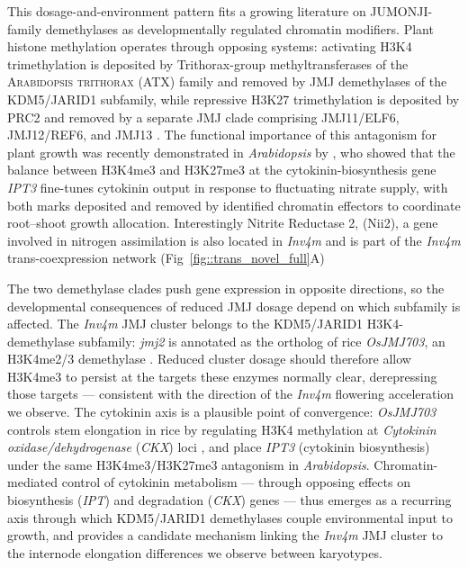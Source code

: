 \documentclass[9pt,twocolumn,twoside]{rilabRxiv}
\newcommand{\invfour}{\textit{Inv4m}\xspace}
\begin{document}
This dosage-and-environment pattern fits a growing literature on JUMONJI-family demethylases as developmentally regulated chromatin modifiers. 
Plant histone methylation operates through opposing systems: activating H3K4 trimethylation is deposited by Trithorax-group methyltransferases of the \textsc{Arabidopsis trithorax} (ATX) family \citep{Alvarez-Venegas2003-sy} and removed by JMJ demethylases of the KDM5/JARID1 subfamily, while repressive H3K27 trimethylation is deposited by PRC2 and removed by a separate JMJ clade comprising JMJ11/ELF6, JMJ12/REF6, and JMJ13 \citep{Lu2011-ie, Gan2015-xi}. 
The functional importance of this antagonism for plant growth was recently demonstrated in \textit{Arabidopsis} by \citet{bellegarde2025}, who showed that the balance between H3K4me3 and H3K27me3 at the cytokinin-biosynthesis gene \textit{IPT3} fine-tunes cytokinin output in response to fluctuating nitrate supply, with both marks deposited and removed by identified chromatin effectors to coordinate root--shoot growth allocation.
Interestingly Nitrite Reductase 2, (Nii2), a gene involved in nitrogen assimilation is also located in \invfour and is part of the \invfour trans-coexpression network (Fig~\ref{fig::trans_novel_full}A)

The two demethylase clades push gene expression in opposite directions, so the developmental consequences of reduced JMJ dosage depend on which subfamily is affected.
The \invfour JMJ cluster belongs to the KDM5/JARID1 H3K4-demethylase subfamily: \textit{jmj2} is annotated as the ortholog of rice \textit{OsJMJ703}, an H3K4me2/3 demethylase \citep{chen2013}. 
Reduced cluster dosage should therefore allow H3K4me3 to persist at the targets these enzymes normally clear, derepressing those targets --- consistent with the direction of the \invfour flowering acceleration we observe. 
The cytokinin axis is a plausible point of convergence: \textit{OsJMJ703} controls stem elongation in rice by regulating H3K4 methylation at \textit{Cytokinin oxidase/dehydrogenase} (\textit{CKX}) loci \citep{chen2013}, and \citet{bellegarde2025} place \textit{IPT3} (cytokinin biosynthesis) under the same H3K4me3/H3K27me3 antagonism in \textit{Arabidopsis}. 
Chromatin-mediated control of cytokinin metabolism --- through opposing effects on biosynthesis (\textit{IPT}) and degradation (\textit{CKX}) genes --- thus emerges as a recurring axis through which KDM5/JARID1 demethylases couple environmental input to growth, and provides a candidate mechanism linking the \invfour JMJ cluster to the internode elongation differences we observe between karyotypes.
\end{document}
